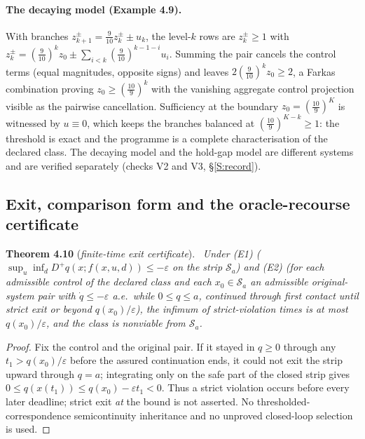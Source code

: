 \documentclass[11pt,a4paper]{article}
\theoremstyle{plain}
\theoremstyle{definition}
\theoremstyle{remark}
\newenvironment{restated}[2]{\par\medskip\noindent\textbf{#1} (\textit{#2}).\ \itshape}{\par\medskip}
\newcommand{\cS}{\mathcal{S}}
\newcommand{\hyp}[1]{\textup{(#1)}}
\begin{document}
\paragraph{The decaying model (Example 4.9).} With branches $z^\pm_{k+1}=\tfrac9{10}z^\pm_k\pm u_k$, the level-$k$ rows are $z^\pm_k\ge1$ with $z^\pm_k=(\tfrac9{10})^kz_0\pm\sum_{i<k}(\tfrac9{10})^{k-1-i}u_i$. Summing the pair cancels the control terms (equal magnitudes, opposite signs) and leaves $2(\tfrac9{10})^kz_0\ge2$, a Farkas combination proving $z_0\ge(\tfrac{10}9)^k$ with the vanishing aggregate control projection visible as the pairwise cancellation. Sufficiency at the boundary $z_0=(\tfrac{10}9)^K$ is witnessed by $u\equiv0$, which keeps the branches balanced at $(\tfrac{10}9)^{K-k}\ge1$: the threshold is exact and the programme is a complete characterisation of the declared class. The decaying model and the hold-gap model are different systems and are verified separately (checks V2 and V3, \S\ref{S:record}).

\subsection{Exit, comparison form and the oracle-recourse certificate}\label{S:recourse}

\begin{restated}{Theorem 4.10}{finite-time exit certificate}
Under \hyp{E1} ($\sup_{u}\inf_dD^+q(x;f(x,u,d))\le-\varepsilon$ on the strip $\cS_a$) and \hyp{E2} (for each admissible control of the declared class and each $x_0\in\cS_a$ an admissible original-system pair with $\dot q\le-\varepsilon$ a.e.\ while $0\le q\le a$, continued through first contact until strict exit or beyond $q(x_0)/\varepsilon$), the infimum of strict-violation times is at most $q(x_0)/\varepsilon$, and the class is nonviable from $\cS_a$.
\end{restated}

\begin{proof}
Fix the control and the original pair. If it stayed in $q\ge0$ through any $t_1>q(x_0)/\varepsilon$ before the assured continuation ends, it could not exit the strip upward through $q=a$; integrating only on the safe part of the closed strip gives $0\le q(x(t_1))\le q(x_0)-\varepsilon t_1<0$. Thus a strict violation occurs before every later deadline; strict exit \emph{at} the bound is not asserted. No thresholded-correspondence semicontinuity inheritance and no unproved closed-loop selection is used.
\end{proof}
\end{document}
